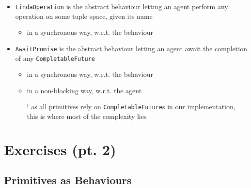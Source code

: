 \documentclass[presentation]{beamer}\mode<presentation>{\usetheme{AMSCesenaPurpleAndGold}}
\begin{document}
\begin{frame}[allowframebreaks]
\begin{itemize}
		\medskip

		\item \texttt{LindaOperation} is the abstract behaviour letting an agent perform \alert{any} \linda{} operation on some tuple space, given its name
		\begin{itemize}
			\item in a \alert{synchronous} way, w.r.t. the behaviour
		\end{itemize}

		\medskip

		\item \texttt{AwaitPromise} is the abstract behaviour letting an agent await the completion of \alert{any} \texttt{CompletableFuture}
		\begin{itemize}
			\item in a \alert{synchronous} way, w.r.t. the behaviour
			\item in a \alert{non-blocking} way, w.r.t. the agent
			\item[!] as all \linda{} primitives rely on \texttt{CompletableFuture}s in our implementation, this is where most of the complexity lies
		\end{itemize}
	\end{itemize}

\end{frame}

\section{Exercises (pt. 2)}

\startExercise

\subsection{\linda{} Primitives as Behaviours}
\end{document}
